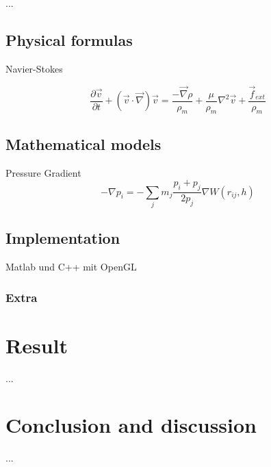 \documentclass[a4paper,12pt,twoside]{report}
\begin{document}
...

\section{Physical formulas}

Navier-Stokes

\begin{equation}
\frac{\partial \overrightarrow v}{\partial t} + ({\overrightarrow v}\cdot{\overrightarrow \nabla}){\overrightarrow v} = \frac{-\overrightarrow \nabla \rho}{\rho_m} + \frac{\mu}{\rho_m}{ \nabla^2}{\overrightarrow v} + \frac{\overrightarrow f_{ext}}{\rho_m} \end{equation}





\section{Mathematical models}

Pressure Gradient
\begin{equation}
{-\nabla p_i} =  {-\sum_j}{m_j}\frac{p_i + p_j}{2p_j}{\nabla W(r_{ij},h)}  \end{equation}




\newpage{}

\section{Implementation}

Matlab und C++ mit OpenGL

\subsection{Extra}

\chapter{Result}

...


\chapter{Conclusion and discussion}

...

\end{document}

